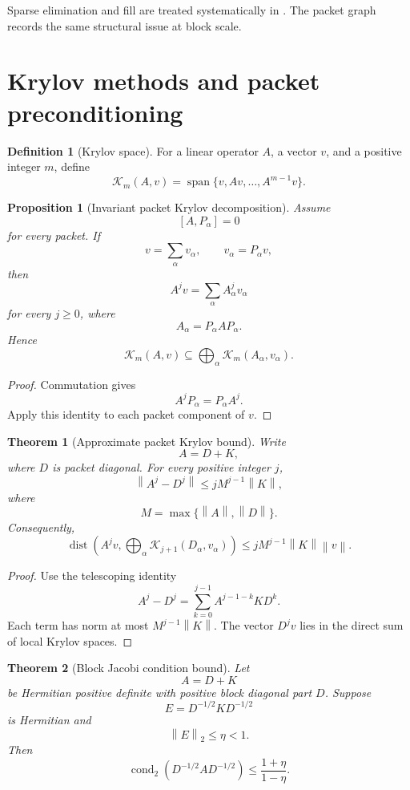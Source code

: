 \documentclass{aomart}
\newtheorem{theorem}{Theorem}[section]
\newtheorem{proposition}[proposition]{Proposition}
\theoremstyle{definition}
\newtheorem{definition}[definition]{Definition}
\theoremstyle{remark}
\newcommand{\Kcal}{\mathcal K}
\newcommand{\cond}{\operatorname{cond}}
\newcommand{\norm}[1]{\left\lVert#1\right\rVert}
\newcommand{\dist}{\operatorname{dist}}
\begin{document}
Sparse elimination and fill are treated systematically in \cite{Davis2006}. The packet graph records the same structural issue at block scale.

\section{Krylov methods and packet preconditioning}\label{sec:krylov}

\begin{definition}[Krylov space]\label{def:krylov}
For a linear operator \(A\), a vector \(v\), and a positive integer \(m\), define
\[
\Kcal_m(A,v)
=
\operatorname{span}
\{v,Av,\ldots,A^{m-1}v\}.
\]
\end{definition}

\begin{proposition}[Invariant packet Krylov decomposition]\label{prop:krylov_invariant}
Assume
\[
[A,P_\alpha]=0
\]
for every packet. If
\[
v=\sum_\alpha v_\alpha,
\qquad
v_\alpha=P_\alpha v,
\]
then
\[
A^jv
=
\sum_\alpha A_\alpha^jv_\alpha
\]
for every \(j\geq0\), where
\[
A_\alpha=P_\alpha AP_\alpha.
\]
Hence
\[
\Kcal_m(A,v)
\subseteq
\bigoplus_\alpha
\Kcal_m(A_\alpha,v_\alpha).
\]
\end{proposition}

\begin{proof}
Commutation gives
\[
A^jP_\alpha=P_\alpha A^j.
\]
Apply this identity to each packet component of \(v\).
\end{proof}

\begin{theorem}[Approximate packet Krylov bound]\label{thm:approx_krylov}
Write
\[
A=D+K,
\]
where \(D\) is packet diagonal. For every positive integer \(j\),
\[
\boxed{
\norm{A^j-D^j}
\leq
jM^{j-1}\norm{K},
}
\]
where
\[
M=\max\{\norm{A},\norm{D}\}.
\]
Consequently,
\[
\dist(A^jv,\bigoplus_\alpha\Kcal_{j+1}(D_\alpha,v_\alpha))
\leq
jM^{j-1}\norm{K}\norm{v}.
\]
\end{theorem}

\begin{proof}
Use the telescoping identity
\[
A^j-D^j
=
\sum_{k=0}^{j-1}
A^{j-1-k}KD^k.
\]
Each term has norm at most \(M^{j-1}\norm{K}\). The vector \(D^jv\) lies in the direct sum of local Krylov spaces.
\end{proof}

\begin{theorem}[Block Jacobi condition bound]\label{thm:block_jacobi}
Let
\[
A=D+K
\]
be Hermitian positive definite with positive block diagonal part \(D\). Suppose
\[
E=D^{-1/2}KD^{-1/2}
\]
is Hermitian and
\[
\norm{E}_2\leq\eta<1.
\]
Then
\[
\boxed{
\cond_2(D^{-1/2}AD^{-1/2})
\leq
\frac{1+\eta}{1-\eta}.
}
\]
\end{theorem}
\end{document}
